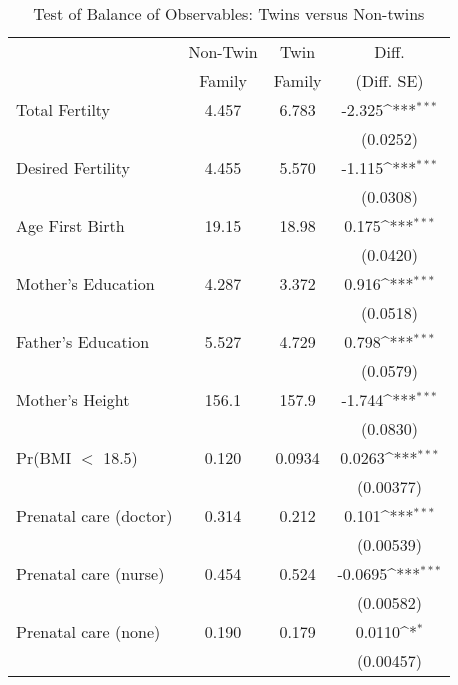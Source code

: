 \begin{table}[htbp]\centering
\def\sym#1{\ifmmode^{#1}\else\(^{#1}\)\fi}
\caption{Test of Balance of Observables: Twins versus Non-twins \label{TWINtab:comp}}
\begin{tabular}{l*{1}{ccc}}
\toprule\toprule & Non-Twin & Twin & Diff.\\
                    &        Family&        Family&      (Diff. SE)         \\
\midrule
Total Fertilty      &       4.457&       6.783&      -2.325\sym{***}\\
                    &            &            &    (0.0252)         \\
Desired Fertility   &       4.455&       5.570&      -1.115\sym{***}\\
                    &            &            &    (0.0308)         \\
Age First Birth     &       19.15&       18.98&       0.175\sym{***}\\
                    &            &            &    (0.0420)         \\
Mother's Education  &       4.287&       3.372&       0.916\sym{***}\\
                    &            &            &    (0.0518)         \\
Father's Education  &       5.527&       4.729&       0.798\sym{***}\\
                    &            &            &    (0.0579)         \\
Mother's Height     &       156.1&       157.9&      -1.744\sym{***}\\
                    &            &            &    (0.0830)         \\
Pr(BMI $<$ 18.5)    &       0.120&      0.0934&      0.0263\sym{***}\\
                    &            &            &   (0.00377)         \\
Prenatal care (doctor)&       0.314&       0.212&       0.101\sym{***}\\
                    &            &            &   (0.00539)         \\
Prenatal care (nurse)&       0.454&       0.524&     -0.0695\sym{***}\\
                    &            &            &   (0.00582)         \\
Prenatal care (none)&       0.190&       0.179&      0.0110\sym{*}  \\
                    &            &            &   (0.00457)         \\

\end{tabular}
\end{table}
